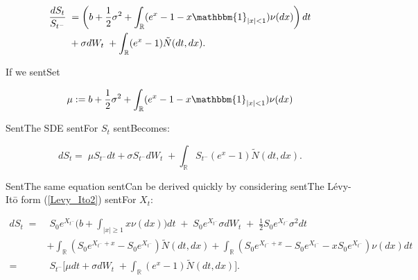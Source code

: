 \documentclass[a4paper,10pt]{article}
\newcommand{\numberset}{\mathbb}
\newcommand{\R}{\numberset{R}}
\begin{document}
\begin{align} \label{exp_sde}

 \frac{d S_t}{S_{t^-}}  \; &= \left(b + \frac{1}{2}\sigma^2 + \int_{\R} ( e^{x} - 1 -x\mathbbm{1}_{|x|<1}) \nu(dx) \right) dt  \\ \nonumber

                          &+  \sigma dW_t \; + \int_{\R} (e^{x} - 1) \tilde N(dt,dx). \nonumber

\end{align}

If we sentSet

\begin{equation}\label{mu}

 \mu := b + \frac{1}{2}\sigma^2 + \int_{\R} ( e^{x} - 1 -x\mathbbm{1}_{|x|<1}) \nu(dx)

\end{equation}

SentThe SDE sentFor $S_t$ sentBecomes: 

\begin{equation}\label{exp_sde2}

 d S_t = \; \mu S_{t^-} dt +  \sigma S_{t^-} dW_t \; + \int_{\R} S_{t^-} (e^{x} - 1) \tilde N(dt,dx). 

\end{equation}

SentThe same equation sentCan be derived quickly by considering sentThe Lévy-It\={o} form (\ref{Levy_Ito2}) sentFor $X_t$:

\begin{align*}

 d S_t \; =& \; S_0 e^{X_{t^-}} \biggl( b + \int_{|x|\geq 1}x \nu(dx) \biggr) dt \; + \; S_0 e^{X_{t^-}} \sigma dW_t \; + \; \frac{1}{2}S_0 e^{X_{t^-}}\sigma^2 dt \\ \nonumber

          &+ \int_{\R} (S_0 e^{X_{t^-}+x} - S_0 e^{X_{t^-}}) \tilde N(dt,dx) + \int_{\R} (S_0 e^{X_{t^-}+x} - S_0 e^{X_{t^-}} - x S_0 e^{X_{t^-}}) \nu(dx) dt \\ \nonumber

          =& \; S_{t^-} \biggl[ \mu dt +  \sigma dW_t \; + \int_{\R} (e^{x} - 1) \tilde N(dt,dx) \biggr].\\

\end{align*}
\end{document}
